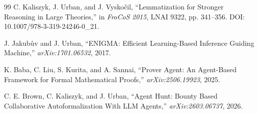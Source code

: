 \documentclass[11pt]{article}
\theoremstyle{definition}
\theoremstyle{remark}
\begin{document}
\begin{thebibliography}{99}
C. Kaliszyk, J. Urban, and J. Vysko\v{c}il,
``Lemmatization for Stronger Reasoning in Large Theories,''
in \emph{FroCoS 2015}, LNAI 9322, pp. 341--356.
DOI: 10.1007/978-3-319-24246-0\_21.

J. Jakub\r{u}v and J. Urban,
``ENIGMA: Efficient Learning-Based Inference Guiding Machine,''
\emph{arXiv:1701.06532}, 2017.

K. Baba, C. Liu, S. Kurita, and A. Sannai,
``Prover Agent: An Agent-Based Framework for Formal Mathematical Proofs,''
\emph{arXiv:2506.19923}, 2025.

C. E. Brown, C. Kaliszyk, and J. Urban,
``Agent Hunt: Bounty Based Collaborative Autoformalization With LLM Agents,''
\emph{arXiv:2603.06737}, 2026.

\end{thebibliography}
\end{document}
